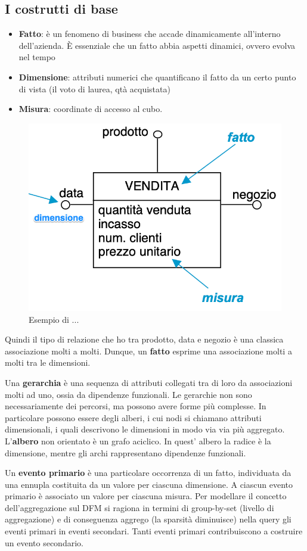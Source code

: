 \subsection{I costrutti di base}
\begin{itemize}
	\item
	\textbf{Fatto}: è un fenomeno di business che accade dinamicamente all’interno dell’azienda. È essenziale che un fatto abbia aspetti dinamici, ovvero evolva nel tempo
	\item 
	\textbf{Dimensione}: attributi numerici che quantificano il fatto da un certo punto di vista (il voto di laurea, qtà acquistata)
	\item 
	\textbf{Misura}: coordinate di accesso al cubo. 
\end{itemize}
\begin{figure}[H]
	\centering
	\includegraphics[width=0.7\linewidth]{img/example_fatto}
	\caption{Esempio di ...}
	\label{fig:exfatto}
\end{figure}
Quindi il tipo di relazione che ho tra prodotto, data e negozio è una classica associazione molti a molti. Dunque, un \textbf{fatto} esprime una associazione molti a molti tra le dimensioni.

Una \textbf{gerarchia} è una sequenza di attributi collegati tra di loro da associazioni molti ad uno, ossia da dipendenze funzionali. Le gerarchie non sono necessariamente dei percorsi, ma possono avere forme più complesse. In particolare possono essere degli alberi, i cui nodi si chiamano attributi dimensionali, i quali descrivono le dimensioni in modo via via più aggregato. L’\textbf{albero} non orientato è un grafo aciclico. In quest' albero la radice è la dimensione, mentre gli archi rappresentano dipendenze funzionali. 

Un \textbf{evento primario} è una particolare occorrenza di un fatto, individuata da una ennupla costituita da un valore per ciascuna dimensione. A ciascun evento primario è associato un valore per ciascuna misura. Per modellare il concetto dell’aggregazione sul DFM si ragiona in termini di group-by-set (livello di aggregazione) e di conseguenza aggrego (la sparsità diminuisce) nella query gli eventi primari in eventi secondari. Tanti eventi primari contribuiscono a costruire un evento secondario.  

